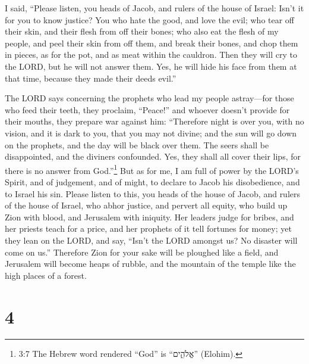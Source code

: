  I said, ``Please listen, you heads of Jacob, and rulers of
the house of Israel: Isn't it for you to know justice?  You
who hate the good, and love the evil; who tear off their skin, and their
flesh from off their bones;  who also eat the flesh of my
people, and peel their skin from off them, and break their bones, and
chop them in pieces, as for the pot, and as meat within the cauldron.
 Then they will cry to the LORD, but he will not answer
them. Yes, he will hide his face from them at that time, because they
made their deeds evil.''

 The LORD says concerning the prophets who lead my people
astray---for those who feed their teeth, they proclaim, ``Peace!'' and
whoever doesn't provide for their mouths, they prepare war against him:
 ``Therefore night is over you, with no vision, and it is
dark to you, that you may not divine; and the sun will go down on the
prophets, and the day will be black over them.  The seers
shall be disappointed, and the diviners confounded. Yes, they shall all
cover their lips, for there is no answer from God.''\footnote{3:7 The
  Hebrew word rendered ``God'' is ``אֱלֹהִ֑ים'' (Elohim).} 
But as for me, I am full of power by the LORD's Spirit, and of
judgement, and of might, to declare to Jacob his disobedience, and to
Israel his sin.  Please listen to this, you heads of the
house of Jacob, and rulers of the house of Israel, who abhor justice,
and pervert all equity,  who build up Zion with blood, and
Jerusalem with iniquity.  Her leaders judge for bribes, and
her priests teach for a price, and her prophets of it tell fortunes for
money; yet they lean on the LORD, and say, ``Isn't the LORD amongst us?
No disaster will come on us.''  Therefore Zion for your
sake will be ploughed like a field, and Jerusalem will become heaps of
rubble, and the mountain of the temple like the high places of a forest.

\hypertarget{section-3}{%
\section{4}\label{section-3}}

